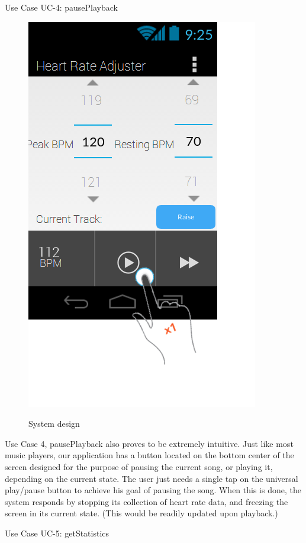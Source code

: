 \documentclass[letterpaper,english, 12pt]{scrreprt}
\begin{document}
Use Case UC-4: pausePlayback

\begin{figure}[H]
	\centering
	\includegraphics{img/Prelim_Design/PrelimDesign_3.png}\\
	\caption{System design}
\end{figure}

Use Case 4, pausePlayback also proves to be extremely intuitive. Just like most music players, our application has a button located on the bottom center of the screen designed for the purpose of pausing the current song, or playing it, depending on the current state. The user just needs a single tap on the universal play/pause button to achieve his goal of pausing the song. When this is done, the system responds by stopping its collection of heart rate data, and freezing the screen in its current state. (This would be readily updated upon playback.)

Use Case UC-5: getStatistics 
\end{document}

